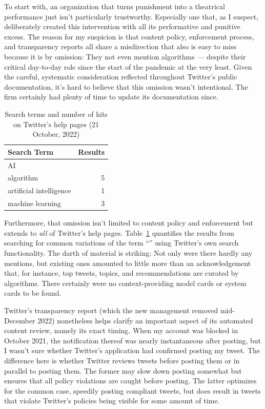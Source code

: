 To start with, an organization that turns punishment into a theatrical
performance just isn't particularly trustworthy. Especially one that, as I
suspect, deliberately created this intervention with all its performative and
punitive excess. The reason for my suspicion is that content policy, enforcement
process, and transparency reports all share a misdirection that also is easy to
miss because it is by omission: They not even mention algorithms --- despite
their critical day-to-day role since the start of the pandemic at the very
least. Given the careful, systematic consideration reflected throughout
Twitter's public documentation, it's hard to believe that this omission wasn't
intentional. The firm certainly had plenty of time to update its documentation
since.

\begin{table}
\caption{Search terms and number of hits on Twitter's help pages (21 October, 2022)}
\label{table:search}
\begin{tabular}{lr}
\textbf{Search Term} & \textbf{Results} \B \\ \hline
AI & \T0 \\
algorithm & 5 \\
artificial intelligence & 1 \\
machine learning & 3 \\
\end{tabular}
\end{table}

Furthermore, that omission isn't limited to content policy and enforcement but
extends to \emph{all} of Twitter's help pages. Table~\ref{table:search}
quantifies the results from searching for common variations of the term ``\AI''
using Twitter's own search functionality. The darth of material is striking: Not
only were there hardly any mentions, but existing ones amounted to little more
than an acknowledgement that, for instance, top tweets, topics, and
recommendations are curated by algorithms. There certainly were no
context-providing model cards or system cards to be found.

Twitter's transparency report (which the new management removed mid-December
2022) nonetheless helps clarify an important aspect of its automated content
review, namely its exact timing. When my account was blocked in October 2021,
the notification thereof was nearly instantaneous after posting, but I wasn't
sure whether Twitter's application had confirmed posting my tweet. The
difference here is whether Twitter reviews tweets before posting them or in
parallel to posting them. The former may slow down posting somewhat but ensures
that all policy violations are caught before posting. The latter optimizes for
the common case, speedily posting compliant tweets, but does result in tweets
that violate Twitter's policies being visible for some amount of time.

